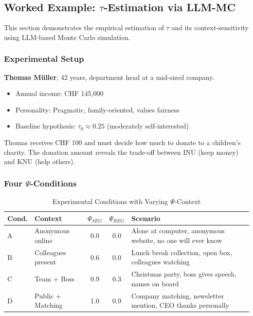 
\subsection{Worked Example: $\tau$-Estimation via LLM-MC}
\label{sec:tau-example}

This section demonstrates the empirical estimation of $\tau$ and its context-sensitivity using LLM-based Monte Carlo simulation.

\subsubsection{Experimental Setup}

\begin{definition}[Persona]
\label{def:example-persona}
\textbf{Thomas Müller}, 42 years, department head at a mid-sized company.
\begin{itemize}
\item Annual income: CHF 145,000
\item Personality: Pragmatic, family-oriented, values fairness
\item Baseline hypothesis: $\tau_0 \approx 0.25$ (moderately self-interested)
\end{itemize}
\end{definition}

\begin{definition}
\label{def:example-task}
Thomas receives CHF 100 and must decide how much to donate to a children's charity. The donation amount reveals the trade-off between INU (keep money) and KNU (help others).
\end{definition}

\subsubsection{Four $\Psi$-Conditions}

\begin{table}[htbp]
\centering
\caption{Experimental Conditions with Varying $\Psi$-Context}
\label{tab:tau-conditions}
\renewcommand{\arraystretch}{1.3}
\begin{tabular}{@{}llccp{5cm}@{}}
\toprule
\textbf{Cond.} & \textbf{Context} & $\Psi_{SEG}$ & $\Psi_{REG}$ & \textbf{Scenario} \\
\midrule
A & Anonymous online & 0.0 & 0.0 & Alone at computer, anonymous website, no one will ever know \\
B & Colleagues present & 0.6 & 0.0 & Lunch break collection, open box, colleagues watching \\
C & Team + Boss & 0.9 & 0.3 & Christmas party, boss gives speech, names on board \\
D & Public + Matching & 1.0 & 0.9 & Company matching, newsletter mention, CEO thanks personally \\
\bottomrule
\end{tabular}
\end{table}


